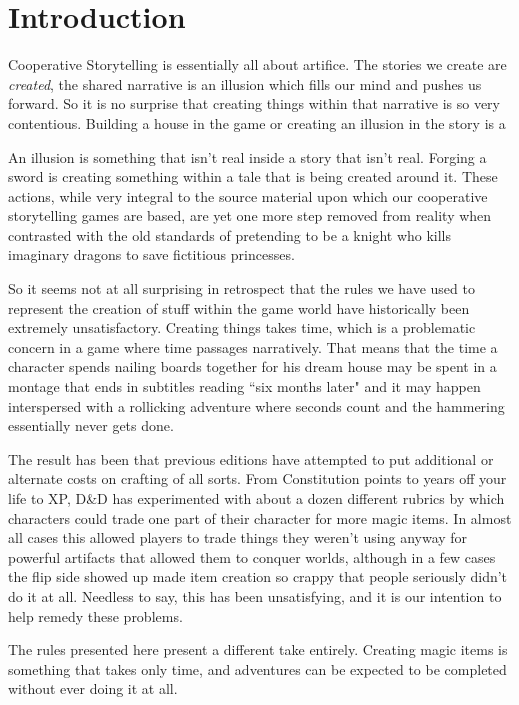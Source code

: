 \section{Introduction}

Cooperative Storytelling is essentially all about artifice. The stories we create are \textit{created}, the shared narrative is an illusion which fills our mind and pushes us forward. So it is no surprise that creating things within that narrative is so very contentious. Building a house in the game or creating an illusion in the story is a

An illusion is something that isn't real inside a story that isn't real. Forging a sword is creating something within a tale that is being created around it. These actions, while very integral to the source material upon which our cooperative storytelling games are based, are yet one more step removed from reality when contrasted with the old standards of pretending to be a knight who kills imaginary dragons to save fictitious princesses.

So it seems not at all surprising in retrospect that the rules we have used to represent the creation of stuff within the game world have historically been extremely unsatisfactory. Creating things takes time, which is a problematic concern in a game where time passages narratively. That means that the time a character spends nailing boards together for his dream house may be spent in a montage that ends in subtitles reading ``six months later" and it may happen interspersed with a rollicking adventure where seconds count and the hammering essentially never gets done.

The result has been that previous editions have attempted to put additional or alternate costs on crafting of all sorts. From Constitution points to years off your life to XP, D\&D has experimented with about a dozen different rubrics by which characters could trade one part of their character for more magic items. In almost all cases this allowed players to trade things they weren't using anyway for powerful artifacts that allowed them to conquer worlds, although in a few cases the flip side showed up made item creation so crappy that people seriously didn't do it at all. Needless to say, this has been unsatisfying, and it is our intention to help remedy these problems.

The rules presented here present a different take entirely. Creating magic items is something that takes only time, and adventures can be expected to be completed without ever doing it at all.

